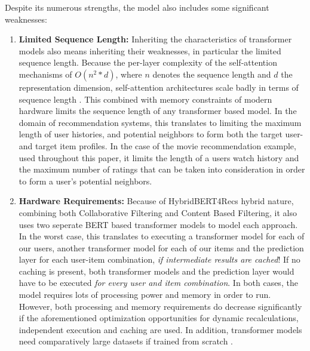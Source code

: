 \documentclass{Academic}
\begin{document}
        Despite its numerous strengths, the model also includes some significant weaknesses:
        \begin{enumerate}
            \item \textbf{Limited Sequence Length:} Inheriting the characteristics of transformer models also means inheriting their weaknesses, in particular the limited sequence length. Because the per-layer complexity of the self-attention mechanisms of $O(n^2*d)$, where $n$ denotes the sequence length and $d$ the representation dimension, self-attention architectures scale badly in terms of sequence length \cite{vaswaniAttentionAllYou2017}. This combined with memory constraints of modern hardware limits the sequence length of any transformer based model. In the domain of recommendation systems, this translates to limiting the maximum length of user histories, and potential neighbors to form both the target user- and target item profiles. In the case of the movie recommendation example, used throughout this paper, it limits the length of a users watch history and the maximum number of ratings that can be taken into consideration in order to form a user's potential neighbors.
            \item \textbf{Hardware Requirements:} Because of HybridBERT4Recs hybrid nature, combining both Collaborative Filtering and Content Based Filtering, it also uses two seperate BERT based transformer models to model each approach. In the worst case, this translates to executing a transformer model for each of our users, another transformer model for each of our items and the prediction layer for each user-item combination, \textit{if intermediate results are cached}! If no caching is present, both transformer models and the prediction layer would have to be executed \textit{for every user and item combination}. In both cases, the model requires lots of processing power and memory in order to run. However, both processing and memory requirements do decrease significantly if the aforementioned optimization opportunities for dynamic recalculations, independent execution and caching are used. In addition, transformer models need comparatively large datasets if trained from scratch \cite{channarongHybridBERT4RecHybridContentBased2022,sunBERT4RecSequentialRecommendation2019,vaswaniAttentionAllYou2017}.
        \end{enumerate}
\end{document}
